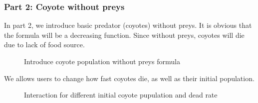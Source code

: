 \documentclass{article}
\begin{document}
\begin{normalsize}
		\subsubsection{Part 2: Coyote without preys}
		In part 2, we introduce basic predator (coyotes) without preys. It is obvious that the formula will be a decreasing function. Since without preys, coyotes will die due to lack of food source.
			\begin{figure}[H]
			\caption{Introduce coyote population without preys formula}
				\end{figure}
		We allows users to change how fast coyotes die, as well as their initial population.
			\begin{figure}[H]
			\caption{Interaction for different initial coyote pupulation and dead rate}
		\end{figure}
	

\end{normalsize}
\end{document}
